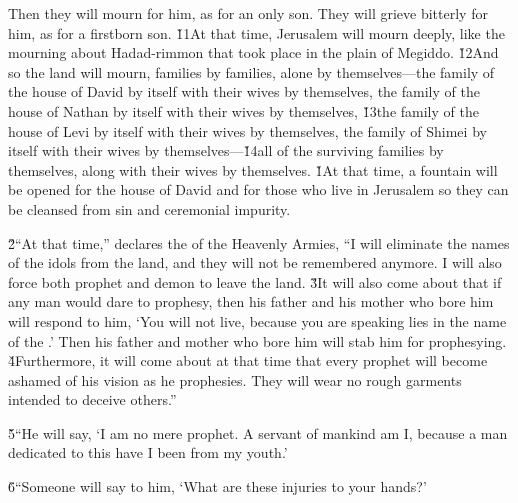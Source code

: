 Then they will mourn for him, as for an only son. They will grieve bitterly for him, as for a firstborn son. \v{11}At that time, Jerusalem will mourn deeply, like the mourning about Hadad-rimmon that took place in the plain of Megiddo. \v{12}And so the land will mourn, families by families, alone by themselves---the family of the house of David by itself with their wives by themselves, the family of the house of Nathan by itself with their wives by themselves, \v{13}the family of the house of Levi by itself with their wives by themselves, the family of Shimei by itself with their wives by themselves---\v{14}all of the surviving families by themselves, along with their wives by themselves.
\v{1}At that time, a fountain will be opened for the house of David and for those who live in Jerusalem so they can be cleansed from sin and ceremonial impurity.

\v{2}``At that time,'' declares the  of the Heavenly Armies, ``I will eliminate the names of the idols from the land, and they will not be remembered anymore. I will also force both prophet and demon to leave the land. \v{3}It will also come about that if any man would dare to prophesy, then his father and his mother who bore him will respond to him, `You will not live, because you are speaking lies in the name of the .' Then his father and mother who bore him will stab him for prophesying. \v{4}Furthermore, it will come about at that time that every prophet will become ashamed of his vision as he prophesies. They will wear no rough garments intended to deceive others.''

\v{5}``He will say, `I am no mere prophet. A servant of mankind am I, because a man dedicated to this have I been from my youth.'

\v{6}``Someone will say to him, `What are these injuries to your hands?'


